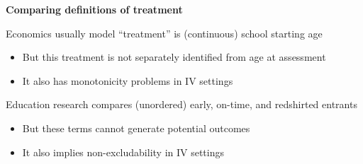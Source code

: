\documentclass[t,aspectratio=169,11pt,presentation]{beamer}
\newenvironment{wideitemize}{\itemize\addtolength{\itemsep}{14pt}}{\enditemize}
\begin{document}
\begin{frame}[label=treatments]{\textbf{Comparing definitions of treatment} }

\begin{wideitemize}
    \item Economics usually model ``treatment'' is (continuous) school starting age
    \begin{itemize}
        \item But this treatment is not separately identified from age at assessment
        
        \item It also has monotonicity problems in IV settings
        
        {\tiny \color{gray}\citep[see discussion in][]{angrist2008mostly,barua2016school}}
        
    \end{itemize}
    
    \item<2-> Education research compares (unordered) early, on-time, and redshirted entrants
    \begin{itemize}
        \item But these terms cannot generate potential outcomes
        \item It also implies non-excludability in IV settings
       
    \end{itemize}
    

    
\end{wideitemize}
\vspace{8em}
\hyperlink{wait1}{}
\end{frame}
\end{document}
